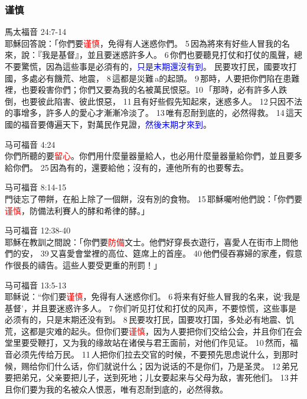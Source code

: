 \subsubsection{谨慎}


馬太福音 24:7-14\\
耶穌回答說：「你們要\textcolor{red}{谨慎}，免得有人迷惑你們。 5 因為將來有好些人冒我的名來，說：『我是基督』，並且要迷惑許多人。 6 你們也要聽見打仗和打仗的風聲，總不要驚慌，因為這些事是必須有的，\textcolor{blue}{只是末期還沒有到}。
民要攻打民，國要攻打國，多處必有饑荒、地震， 8 這都是災難 a的起頭。 9 那時，人要把你們陷在患難裡，也要殺害你們；你們又要為我的名被萬民恨惡。10 「那時，必有許多人跌倒，也要彼此陷害、彼此恨惡， 11 且有好些假先知起來，迷惑多人。 12 只因不法的事增多，許多人的愛心才漸漸冷淡了。 13 唯有忍耐到底的，必然得救。 14 這天國的福音要傳遍天下，對萬民作見證，\textcolor{blue}{然後末期才來到}。

马可福音 4:24\\
你們所聽的要\textcolor{red}{留心}。你們用什麼量器量給人，也必用什麼量器量給你們，並且要多給你們。 25 因為有的，還要給他；沒有的，連他所有的也要奪去。


马可福音 8:14-15\\
門徒忘了帶餅，在船上除了一個餅，沒有別的食物。 15 耶穌囑咐他們說：「你們要\textcolor{red}{谨慎}，防備法利賽人的酵和希律的酵。」

马可福音 12:38-40\\
耶穌在教訓之間說：「你們要\textcolor{red}{防備}文士。他們好穿長衣遊行，喜愛人在街市上問他們的安， 39 又喜愛會堂裡的高位、筵席上的首座。 40 他們侵吞寡婦的家產，假意作很長的禱告。這些人要受更重的刑罰！」

马可福音 13:5-13\\
耶稣说：“你们要\textcolor{red}{谨慎}，免得有人迷惑你们。 6 将来有好些人冒我的名来，说‘我是基督’，并且要迷惑许多人。 7 你们听见打仗和打仗的风声，不要惊慌，这些事是必须有的，只是末期还没有到。 8 民要攻打民，国要攻打国，多处必有地震、饥荒，这都是灾难的起头。但你们要\textcolor{red}{谨慎}，因为人要把你们交给公会，并且你们在会堂里要受鞭打，又为我的缘故站在诸侯与君王面前，对他们作见证。 10 然而，福音必须先传给万民。 11 人把你们拉去交官的时候，不要预先思虑说什么，到那时候，赐给你们什么话，你们就说什么；因为说话的不是你们，乃是圣灵。 12 弟兄要把弟兄，父亲要把儿子，送到死地；儿女要起来与父母为敌，害死他们。 13 并且你们要为我的名被众人恨恶，唯有忍耐到底的，必然得救。

